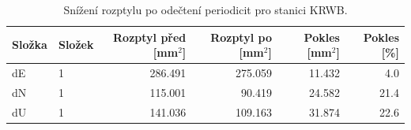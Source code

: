 \begin{table}[H]
\centering
\small
\caption{Snížení rozptylu po odečtení periodicit pro stanici KRWB.}
\label{tab:gop25wd04_stcd_krwb_detr_weighted_multiseg_spectral_lomb_scargle_variance_reduction}
\begin{tabular}{llrrrr}
\toprule
Složka & Složek & Rozptyl před [mm$^2$] & Rozptyl po [mm$^2$] & Pokles [mm$^2$] & Pokles [\%] \\
\midrule
dE & 1 & 286.491 & 275.059 & 11.432 & 4.0 \\
dN & 1 & 115.001 & 90.419 & 24.582 & 21.4 \\
dU & 1 & 141.036 & 109.163 & 31.874 & 22.6 \\
\bottomrule
\end{tabular}
\end{table}
